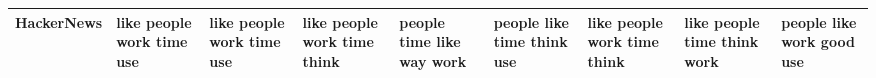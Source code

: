 \documentclass[11pt,a4paper]{article}
\begin{document}
\begin{appendices}
\begin{table}[htp]
\begin{tiny}
\begin{tabular}{|p{}|p{}|p{}|p{}|p{}|p{}|p{}|p{}|p{}|}
HackerNews & like \newline people \newline work \newline time \newline use & like \newline people \newline work \newline time \newline use & like \newline people \newline work \newline time \newline think & people \newline time \newline like \newline way \newline work & people \newline like \newline time \newline think \newline use & like \newline people \newline work \newline time \newline think & like \newline people \newline time \newline think \newline work & people \newline like \newline work \newline good \newline use\\\hline

\end{tabular}
\end{tiny}
\end{table}
\end{appendices}
\end{document}
